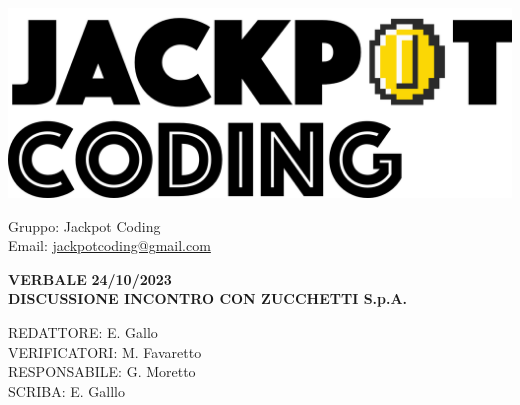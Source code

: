 \documentclass[5pt]{article}
\begin{document}
\begin{minipage}[t]{0.50\textwidth}
    \begin{flushleft}
        \hspace{10pt}
        \includegraphics[scale=0.65]{jackpot-logo.png} 
    \end{flushleft}
\end{minipage}
\hspace{-60pt} %
\begin{flushright}
    \begin{minipage}[t]{0.50\textwidth}
        \begin{flushright}
            Gruppo: {\Large Jackpot Coding}\\
            Email: \href{mailto:jackpotcoding@gmail.com}{jackpotcoding@gmail.com}
        \end{flushright}
    \end{minipage}
\end{flushright}

\vspace{24pt}

\begin{center}
    \textbf{\large VERBALE }
    \textbf{\large 24/10/2023} \\
    \textbf{\Large DISCUSSIONE INCONTRO CON ZUCCHETTI S.p.A.}
\end{center}

\vspace{13pt}

\begin{flushleft}
    \begin{spacing}{1.5}
        REDATTORE: E. Gallo\\%
        VERIFICATORI: M. Favaretto \\
        RESPONSABILE: G. Moretto\\%
        \vspace{7pt}
        SCRIBA: E. Galllo\\%
    \end{spacing}
\end{flushleft}
\end{document}
